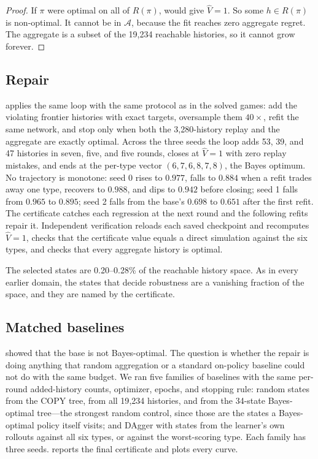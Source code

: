 \documentclass[conference]{IEEEtran}
\begin{document}
\begin{proof}
If $\pi$ were optimal on all of $R(\pi)$,  would give $\hat V=1$. So some $h\in R(\pi)$ is non-optimal. It cannot be in $\mathcal{A}$, because the fit reaches zero aggregate regret. The aggregate is a subset of the 19{,}234 reachable histories, so it cannot grow forever.
\end{proof}

\subsection{Repair}
 applies the same loop with the same protocol as in the solved games: add the violating frontier histories with exact targets, oversample them $40\times$, refit the same network, and stop only when both the 3{,}280-history replay and the aggregate are exactly optimal. Across the three seeds the loop adds 53, 39, and 47 histories in seven, five, and five rounds, closes at $\hat V=1$ with zero replay mistakes, and ends at the per-type vector $(6,7,6,8,7,8)$, the Bayes optimum. No trajectory is monotone: seed 0 rises to $0.977$, falls to $0.884$ when a refit trades away one type, recovers to $0.988$, and dips to $0.942$ before closing; seed 1 falls from $0.965$ to $0.895$; seed 2 falls from the base's $0.698$ to $0.651$ after the first refit. The certificate catches each regression at the next round and the following refits repair it. Independent verification reloads each saved checkpoint and recomputes $\hat V=1$, checks that the certificate value equals a direct simulation against the six types, and checks that every aggregate history is optimal.

The selected states are 0.20--0.28\% of the reachable history space. As in every earlier domain, the states that decide robustness are a vanishing fraction of the space, and they are named by the certificate.

\subsection{Matched baselines}
 showed that the base is not Bayes-optimal. The question is whether the repair is doing anything that random aggregation or a standard on-policy baseline could not do with the same budget. We ran five families of baselines with the same per-round added-history counts, optimizer, epochs, and stopping rule: random states from the COPY tree, from all 19{,}234 histories, and from the 34-state Bayes-optimal tree---the strongest random control, since those are the states a Bayes-optimal policy itself visits; and DAgger \cite{ross2011} with states from the learner's own rollouts against all six types, or against the worst-scoring type. Each family has three seeds.  reports the final certificate and  plots every curve.
\end{document}
